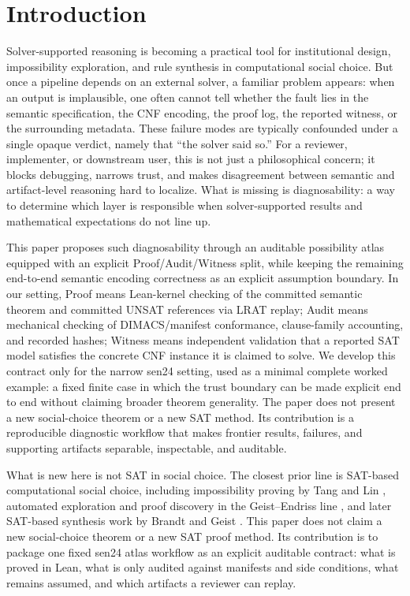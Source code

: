 \section{Introduction}

Solver-supported reasoning is becoming a practical tool for institutional design, impossibility exploration, and rule synthesis in computational social choice. But once a pipeline depends on an external solver, a familiar problem appears: when an output is implausible, one often cannot tell whether the fault lies in the semantic specification, the CNF encoding, the proof log, the reported witness, or the surrounding metadata. These failure modes are typically confounded under a single opaque verdict, namely that ``the solver said so.'' For a reviewer, implementer, or downstream user, this is not just a philosophical concern; it blocks debugging, narrows trust, and makes disagreement between semantic and artifact-level reasoning hard to localize. What is missing is diagnosability: a way to determine which layer is responsible when solver-supported results and mathematical expectations do not line up.

This paper proposes such diagnosability through an auditable possibility atlas equipped with an explicit Proof/Audit/Witness split, while keeping the remaining end-to-end semantic encoding correctness as an explicit assumption boundary. In our setting, Proof means Lean-kernel checking of the committed semantic theorem and committed UNSAT references via LRAT replay; Audit means mechanical checking of DIMACS/manifest conformance, clause-family accounting, and recorded hashes; Witness means independent validation that a reported SAT model satisfies the concrete CNF instance it is claimed to solve. We develop this contract only for the narrow sen24 setting, used as a minimal complete worked example: a fixed finite case in which the trust boundary can be made explicit end to end without claiming broader theorem generality. The paper does not present a new social-choice theorem or a new SAT method. Its contribution is a reproducible diagnostic workflow that makes frontier results, failures, and supporting artifacts separable, inspectable, and auditable.

What is new here is not SAT in social choice.
The closest prior line is SAT-based computational social choice, including impossibility proving by Tang and Lin \citep{tanglin2009computer}, automated exploration and proof discovery in the Geist--Endriss line \citep{geist2011automated}, and later SAT-based synthesis work by Brandt and Geist \citep{brandtgeist2016strategyproof}.
This paper does not claim a new social-choice theorem or a new SAT proof method.
Its contribution is to package one fixed sen24 atlas workflow as an explicit auditable contract: what is proved in Lean, what is only audited against manifests and side conditions, what remains assumed, and which artifacts a reviewer can replay.


